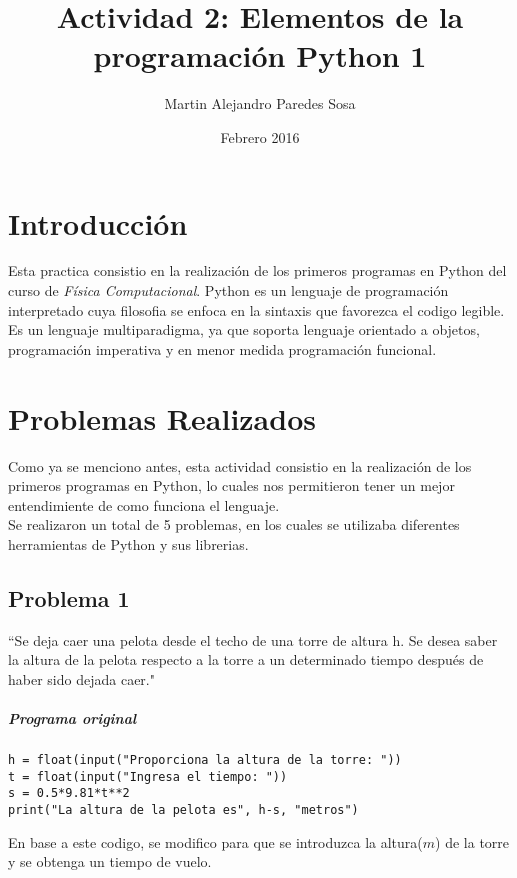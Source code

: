 \documentclass[12pt]{article}
\title{Actividad 2: Elementos de la programación Python 1}
\author{Martin Alejandro Paredes Sosa}
\date{Febrero 2016}
\begin{document}
\maketitle

\section{Introducción}
Esta practica consistio en la realización de los primeros programas en Python del curso de \textit{Física Computacional}. Python es un lenguaje de programación interpretado cuya filosofia se enfoca en la sintaxis que favorezca el codigo legible. Es un lenguaje multiparadigma, ya que soporta lenguaje orientado a objetos, programación imperativa y en menor medida programación funcional. \cite{PyWiki}


\section{Problemas Realizados}

Como ya se menciono antes, esta actividad consistio en la realización de los primeros programas en Python, lo cuales nos permitieron tener un mejor entendimiente de como funciona el lenguaje.\\

Se realizaron un total de 5 problemas, en los cuales se utilizaba diferentes herramientas de Python y sus librerias.

\subsection{Problema 1}

``Se deja caer una pelota desde el techo de una torre de altura h. Se desea saber la altura de la pelota respecto a la torre a un determinado tiempo después de haber sido dejada caer."\cite{act}

\subparagraph*{Programa original}

\begin{verbatim}
h = float(input("Proporciona la altura de la torre: "))
t = float(input("Ingresa el tiempo: "))
s = 0.5*9.81*t**2
print("La altura de la pelota es", h-s, "metros")
\end{verbatim}

En base a este codigo, se modifico para que se introduzca la altura($m$) de la torre y se obtenga un tiempo de vuelo.
\end{document}
